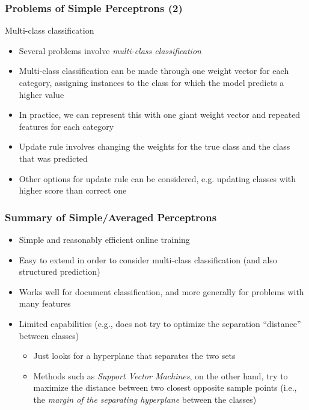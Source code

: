 \documentclass{beamer}
\begin{document}
\begin{frame} \frametitle{Problems of Simple Perceptrons (2)}
\begin{block}{Multi-class classification}
\begin{itemize}
\item Several problems involve \emph{multi-class classification}
\item Multi-class classification can be made through one weight vector for each category, assigning instances to the class for which the model predicts a higher value
\end{itemize}
\end{block}
\begin{block}{}
\begin{itemize}
\item In practice, we can represent this with one giant weight vector and repeated features for each category
\item Update rule involves changing the weights for the true class and the class that was predicted
\item Other options for update rule can be considered, e.g. updating classes with higher score than correct one 
\end{itemize}
\end{block}
\end{frame}

\begin{frame} \frametitle{Summary of Simple/Averaged Perceptrons}
  \begin{itemize}
  \item Simple and reasonably efficient online training
  \item Easy to extend in order to consider multi-class classification (and also structured prediction)
  \item Works well for document classification, and more generally for problems with many features
  \item Limited capabilities (e.g., does not try to optimize the separation ``distance'' between classes)
  \begin{itemize}
  \item Just looks for a hyperplane that separates the two sets 
  \item Methods such as \emph{Support Vector Machines}, on the other hand, try to maximize the distance between two closest opposite sample points (i.e., the \emph{margin of the separating hyperplane} between the classes)
  \end{itemize}  
  \end{itemize}
\end{frame}
\end{document}
